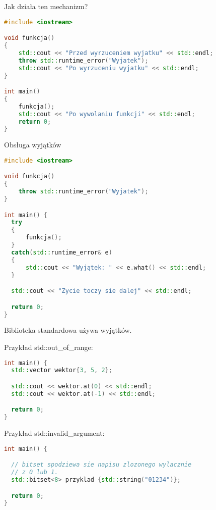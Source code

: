 \documentclass[notheorems, aspectratio=54]{beamer}
\begin{document}
\begin{frame}
	Jak działa ten mechanizm?
	
	\begin{lstlisting}[language=C++]
#include <iostream>

void funkcja()
{
    std::cout << "Przed wyrzuceniem wyjatku" << std::endl;
    throw std::runtime_error("Wyjatek");
    std::cout << "Po wyrzuceniu wyjatku" << std::endl;
}

int main()
{
    funkcja();
    std::cout << "Po wywolaniu funkcji" << std::endl;
    return 0;
}
	\end{lstlisting}
\end{frame}

\begin{frame}
	Obsługa wyjątków
	
	\begin{lstlisting}[language=C++]
#include <iostream>

void funkcja()
{
    throw std::runtime_error("Wyjatek");
}

int main() {
  try
  {
      funkcja();
  }
  catch(std::runtime_error& e)
  {
      std::cout << "Wyjątek: " << e.what() << std::endl;
  }

  std::cout << "Zycie toczy sie dalej" << std::endl;

  return 0;
}
	\end{lstlisting}
\end{frame}

\begin{frame}
	Biblioteka standardowa używa wyjątków.
	
	Przykład std::out_of_range:
	\begin{lstlisting}[language=C++]
int main() {
  std::vector wektor{3, 5, 2};

  std::cout << wektor.at(0) << std::endl;
  std::cout << wektor.at(-1) << std::endl;

  return 0;
}
	\end{lstlisting}
	
	Przykład std::invalid_argument:
	\begin{lstlisting}[language=C++]
int main() {

  // bitset spodziewa sie napisu zlozonego wylacznie
  // z 0 lub 1.
  std::bitset<8> przyklad {std::string("01234")};

  return 0;
}
	\end{lstlisting}
	
\end{frame}
\end{document}
